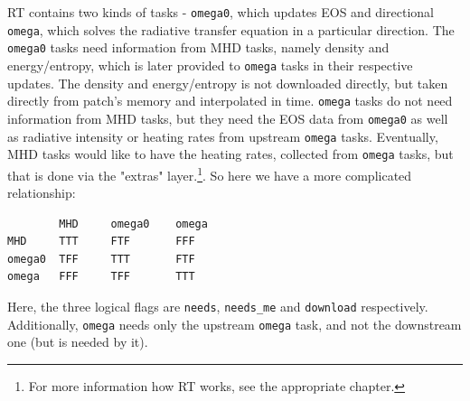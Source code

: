 \documentclass[paper=a4,fontsize=11pt]{scrartcl}
\numberwithin{equation}{section}		%
\numberwithin{figure}{section}			%
\numberwithin{table}{section}				%
\newcommand{\codecolor}{\color{Blue}}
\newcommand{\Code}[1]{{\codecolor\texttt{#1}}}
\begin{document}
RT contains two kinds of tasks - \Code{omega0}, which updates EOS and directional \Code{omega}, which solves the radiative transfer equation in a particular direction. The \Code{omega0} tasks need information from MHD tasks, namely density and energy/entropy, which is later provided to \Code{omega} tasks in their respective updates. The density and energy/entropy is not downloaded directly, but taken directly from patch's memory and interpolated in time. \Code{omega} tasks do not need information from MHD tasks, but they need the EOS data from \Code{omega0} as well as radiative intensity or heating rates from upstream \Code{omega} tasks. Eventually, MHD tasks would like to have the heating rates, collected from \Code{omega} tasks, but that is done via the "extras" layer.\footnote{For more information how RT works, see the appropriate chapter.}. So here we have a more complicated relationship:
{\codecolor\begin{verbatim}
        MHD     omega0    omega
MHD     TTT     FTF       FFF
omega0  TFF     TTT       FTF
omega   FFF     TFF       TTT
\end{verbatim}}
Here, the three logical flags are \Code{needs}, \Code{needs\_me} and \Code{download} respectively. Additionally, \Code{omega} needs only the upstream \Code{omega} task, and not the downstream one (but is needed by it).
\end{document}

